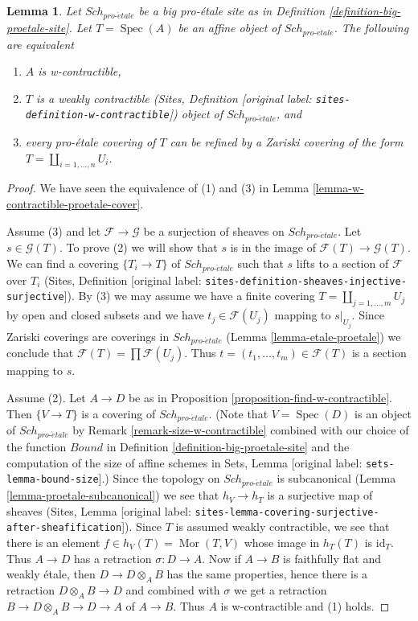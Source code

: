 \documentclass[10pt,a4paper]{article}
\theoremstyle{plain}
\newtheorem{lemma}[subsection]{Lemma}
\theoremstyle{definition}
\theoremstyle{remark}
\numberwithin{equation}{subsection}
\def\Spec{\mathop{\mathrm{Spec}}}
\def\Sch{\mathit{Sch}}
\def\Mor{\mathop{\mathrm{Mor}}\nolimits}
\def\proetale{{pro\text{-}\acute{e}tale}}
\begin{document}
\begin{lemma}
\label{lemma-w-contractible-is-weakly-contractible}
Let $\Sch_\proetale$ be a big pro-\'etale site as in
Definition \ref{definition-big-proetale-site}.
Let $T = \Spec(A)$ be an affine object of $\Sch_\proetale$.
The following are equivalent
\begin{enumerate}
\item $A$ is w-contractible,
\item $T$ is a weakly contractible
(Sites, Definition \textnormal{[original label: \nolinkurl{sites-definition-w-contractible}]})
object of $\Sch_\proetale$, and
\item every pro-\'etale covering of $T$ can be refined by
a Zariski covering of the form $T = \coprod_{i = 1, \ldots, n} U_i$.
\end{enumerate}
\end{lemma}

\begin{proof}
We have seen the equivalence of (1) and (3) in
Lemma \ref{lemma-w-contractible-proetale-cover}.

\medskip\noindent
Assume (3) and let $\mathcal{F} \to \mathcal{G}$ be a surjection of sheaves on
$\Sch_\proetale$. Let $s \in \mathcal{G}(T)$. To prove (2) we will show that
$s$ is in the image of $\mathcal{F}(T) \to \mathcal{G}(T)$. We can find a
covering $\{T_i \to T\}$ of $\Sch_\proetale$ such that $s$ lifts
to a section of $\mathcal{F}$ over $T_i$
(Sites, Definition \textnormal{[original label: \nolinkurl{sites-definition-sheaves-injective-surjective}]}).
By (3) we may assume we have a finite covering
$T = \coprod_{j = 1, \ldots, m} U_j$ by open and closed subsets
and we have $t_j \in \mathcal{F}(U_j)$ mapping to $s|_{U_j}$.
Since Zariski coverings are coverings in $\Sch_\proetale$
(Lemma \ref{lemma-etale-proetale}) we conclude that
$\mathcal{F}(T) = \prod \mathcal{F}(U_j)$.
Thus $t = (t_1, \ldots, t_m) \in \mathcal{F}(T)$
is a section mapping to $s$.

\medskip\noindent
Assume (2). Let $A \to D$ be as in
Proposition \ref{proposition-find-w-contractible}.
Then $\{V \to T\}$ is a covering of $\Sch_\proetale$.
(Note that $V = \Spec(D)$ is an object of $\Sch_\proetale$
by Remark \ref{remark-size-w-contractible}
combined with our choice of the function
$Bound$ in Definition \ref{definition-big-proetale-site}
and the computation of the size of affine schemes in
Sets, Lemma \textnormal{[original label: \nolinkurl{sets-lemma-bound-size}]}.)
Since the topology on $\Sch_\proetale$ is subcanonical
(Lemma \ref{lemma-proetale-subcanonical})
we see that $h_V \to h_T$ is a surjective map of sheaves
(Sites, Lemma \textnormal{[original label: \nolinkurl{sites-lemma-covering-surjective-after-sheafification}]}).
Since $T$ is assumed weakly contractible, we see that there is an element
$f \in h_V(T) = \Mor(T, V)$ whose image in $h_T(T)$ is $\text{id}_T$.
Thus $A \to D$ has a retraction $\sigma : D \to A$.
Now if $A \to B$ is faithfully flat and weakly \'etale, then
$D \to D \otimes_A B$ has the same properties, hence
there is a retraction $D \otimes_A B \to D$ and combined
with $\sigma$ we get a retraction $B \to D \otimes_A B \to D \to A$
of $A \to B$. Thus $A$ is w-contractible and (1) holds.
\end{proof}
\end{document}
